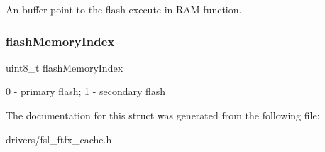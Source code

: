 An buffer point to the flash execute-\/in-\/\+R\+AM function. \mbox{\label{struct__ftfx__cache__config_a678cbdcc5f6a13f253734d0ab489aee0}} 
\subsubsection{\texorpdfstring{flashMemoryIndex}{flashMemoryIndex}}
{\footnotesize\ttfamily uint8\+\_\+t flash\+Memory\+Index}

0 -\/ primary flash; 1 -\/ secondary flash 

The documentation for this struct was generated from the following file\+:\begin{DoxyCompactItemize}
\item 
drivers/fsl\+\_\+ftfx\+\_\+cache.\+h\end{DoxyCompactItemize}
